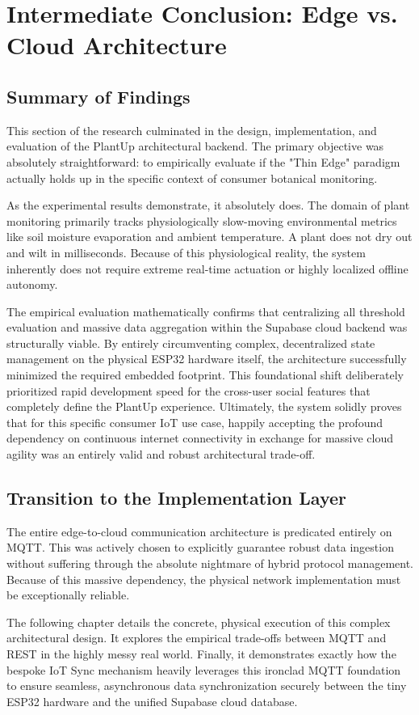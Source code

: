 \section{Intermediate Conclusion: Edge vs. Cloud Architecture}

\subsection{Summary of Findings}

This section of the research culminated in the design, implementation, and evaluation of the PlantUp architectural backend. The primary objective was absolutely straightforward: to empirically evaluate if the "Thin Edge" paradigm actually holds up in the specific context of consumer botanical monitoring. 

As the experimental results demonstrate, it absolutely does. The domain of plant monitoring primarily tracks physiologically slow-moving environmental metrics like soil moisture evaporation and ambient temperature. A plant does not dry out and wilt in milliseconds. Because of this physiological reality, the system inherently does not require extreme real-time actuation or highly localized offline autonomy. 

The empirical evaluation mathematically confirms that centralizing all threshold evaluation and massive data aggregation within the Supabase cloud backend was structurally viable. By entirely circumventing complex, decentralized state management on the physical ESP32 hardware itself, the architecture successfully minimized the required embedded footprint. This foundational shift deliberately prioritized rapid development speed for the cross-user social features that completely define the PlantUp experience. Ultimately, the system solidly proves that for this specific consumer IoT use case, happily accepting the profound dependency on continuous internet connectivity in exchange for massive cloud agility was an entirely valid and robust architectural trade-off.


\subsection{Transition to the Implementation Layer}

The entire edge-to-cloud communication architecture is predicated entirely on MQTT. This was actively chosen to explicitly guarantee robust data ingestion without suffering through the absolute nightmare of hybrid protocol management. Because of this massive dependency, the physical network implementation must be exceptionally reliable. 

The following chapter details the concrete, physical execution of this complex architectural design. It explores the empirical trade-offs between MQTT and REST in the highly messy real world. Finally, it demonstrates exactly how the bespoke IoT Sync mechanism heavily leverages this ironclad MQTT foundation to ensure seamless, asynchronous data synchronization securely between the tiny ESP32 hardware and the unified Supabase cloud database.
